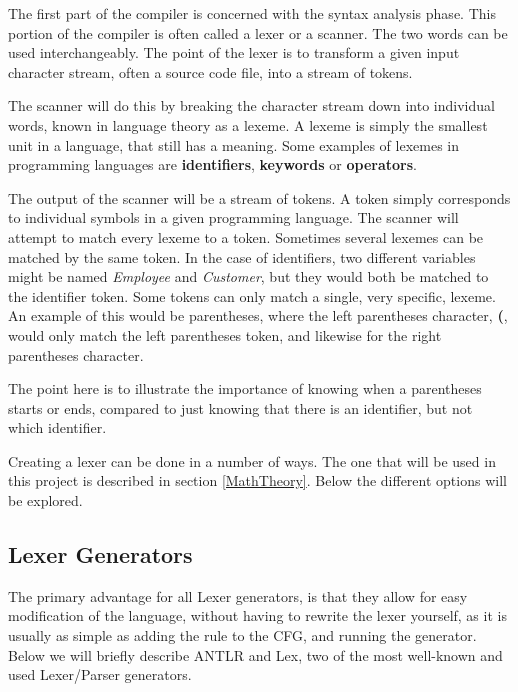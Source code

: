 The first part of the compiler is concerned with the syntax analysis phase.
This portion of the compiler is often called a lexer or a scanner.
The two words can be used interchangeably. 
The point of the lexer is to transform a given input character stream, often a source code file, into a stream of tokens.

The scanner will do this by breaking the character stream down into individual words, known in language theory as a lexeme.
A lexeme is simply the smallest unit in a language, that still has a meaning.
Some examples of lexemes in programming languages are \textbf{identifiers}, \textbf{keywords} or \textbf{operators}.

The output of the scanner will be a stream of tokens.
A token simply corresponds to individual symbols in a given programming language.
The scanner will attempt to match every lexeme to a token.
Sometimes several lexemes can be matched by the same token.
In the case of identifiers, two different variables might be named \textit{Employee} and \textit{Customer}, but they would both be matched to the identifier token.
Some tokens can only match a single, very specific, lexeme.
An example of this would be parentheses, where the left parentheses character, \textbf{(}, would only match the left parentheses token, and likewise for the right parentheses character.

The point here is to illustrate the importance of knowing when a parentheses starts or ends, compared to just knowing that there is an identifier, but not which identifier.


Creating a lexer can be done in a number of ways.
The one that will be used in this project is described in section \ref{MathTheory}.
Below the different options will be explored.
\subsection{Lexer Generators}
The primary advantage for all Lexer generators, is that they allow for easy modification of the language, without having to  rewrite the lexer yourself, as it is usually as simple as adding the rule to the CFG, and running the generator.
Below we will briefly describe ANTLR and Lex, two of the most well-known and used Lexer/Parser generators.


